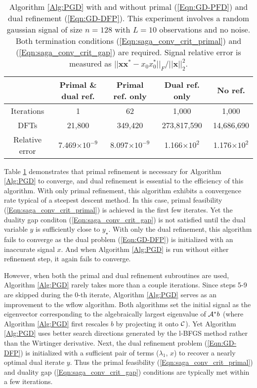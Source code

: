 \begin{table}[H]
\centering
\begin{tabular}{ |c|c|c|c|c| }
 \hline
	& Primal \& dual ref.
 			& Primal ref. only  &	Dual ref. only & No ref. \\
 \hline
 Iterations 		& 1	&  62 	&	1,000	&  1,000	\\
 DFTs 	& 21,800 	& 349,420 &	 273,817,590 	&  14,686,690	\\
 Relative error & 	7.469$\times 10^{-9}$		&	8.097$\times 10^{-9}$ &	1.166$\times 10^{2}$	& 	 1.176$\times 10^{2}$	\\
 \hline
\end{tabular}
\caption{Algorithm \ref{Alg:PGD} with and without primal (\ref{Eqn:GD-PFD}) and dual refinement (\ref{Eqn:GD-DFP}). This experiment involves a random gaussian signal of size $n = 128$ with $L = 10$ observations and no noise.  Both termination conditions (\ref{Eqn:saga_conv_crit_primal}) and (\ref{Eqn:saga_conv_crit_gap}) are required.  Signal relative error is measured as $|| \mathbf{x}\mathbf{x}^* - x_0x_0^* ||_F / ||\mathbf{x}||_2^2$.} \label{Tab:noiseless_runtimes}
\end{table}


Table \ref{Tab:noiseless_runtimes} demonstrates that primal refinement is necessary for Algorithm \ref{Alg:PGD} to converge, and dual refinement is essential to the efficiency of this algorithm.  With only primal refinement, this algorithm exhibits a convergence rate typical of a steepest descent method.   In this case, primal feasibility (\ref{Eqn:saga_conv_crit_primal}) is achieved in the first few iterates.  Yet the duality gap conditon (\ref{Eqn:saga_conv_crit_gap}) is not satisfied until the dual variable $y$ is sufficiently close to $y_\star$.  With only the dual refinement, this algorithm fails to converge as the dual problem (\ref{Eqn:GD-DFP}) is initialized with an inaccurate signal $x$.  And when Algorithm \ref{Alg:PGD} is run without either refinement step, it again fails to converge.  


However, when both the primal and dual refinement subroutines are used, Algorithm \ref{Alg:PGD} rarely takes more than a couple iterations.  Since steps 5-9 are skipped during the $0$-th iterate, Algorithm \ref{Alg:PGD} serves as an improvement to the wflow algorithm.  Both algorithms set the initial signal as the eigenvector corresponding to the algebraically largest eigenvalue of ${\mathcal A}^*b$ (where Algorithm \ref{Alg:PGD} first rescales $b$ by projecting it onto ${\mathcal C}$).  Yet Algorithm \ref{Alg:PGD} uses better search directions generated by the l-BFGS method rather than the Wirtinger derivative.  Next, the dual refinement problem (\ref{Eqn:GD-DFP}) is initialized with a sufficient pair of terms ($\lambda_1$, $x$) to recover a nearly optimal dual iterate $y$.  Thus the primal feasibility (\ref{Eqn:saga_conv_crit_primal}) and duality gap (\ref{Eqn:saga_conv_crit_gap}) conditions are typically met within a few iterations.  



